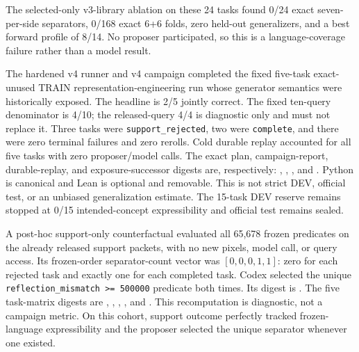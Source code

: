 \documentclass[11pt]{article}
\begin{document}
The selected-only v3-library ablation on these 24 tasks found 0/24 exact
seven-per-side separators, 0/168 exact 6+6 folds, zero held-out generalizers,
and a best forward profile of 8/14.  No proposer participated, so this is a
language-coverage failure rather than a model result.

The hardened v4 runner and v4 campaign completed the fixed five-task
exact-unused TRAIN representation-engineering run whose generator semantics
were historically exposed.  The headline is 2/5 jointly correct.  The fixed
ten-query denominator is 4/10; the released-query 4/4 is diagnostic only and
must not replace it.  Three tasks were \texttt{support\_rejected}, two were
\texttt{complete}, and there were zero terminal failures and zero rerolls.
Cold durable replay accounted for all five tasks with zero proposer/model
calls.  The exact plan, campaign-report, durable-replay, and
exposure-successor digests are, respectively:
,
,
,
and
.
Python is canonical and Lean is optional and removable.  This is not strict
DEV, official test, or an unbiased generalization estimate.  The 15-task DEV
reserve remains stopped at 0/15 intended-concept expressibility and official
test remains sealed.

A post-hoc support-only counterfactual evaluated all 65,678 frozen predicates
on the already released support packets, with no new pixels, model call, or
query access.  Its frozen-order separator-count vector was
$[0,0,0,1,1]$: zero for each rejected task and exactly one for each completed
task.  Codex selected the unique
\texttt{reflection\_mismatch >= 500000} predicate both times.  Its digest is
.
The five task-matrix digests are
,
,
,
,
and
.
This recomputation is diagnostic, not a campaign metric.  On this cohort,
support outcome perfectly tracked frozen-language expressibility and the
proposer selected the unique separator whenever one existed.
\end{document}

